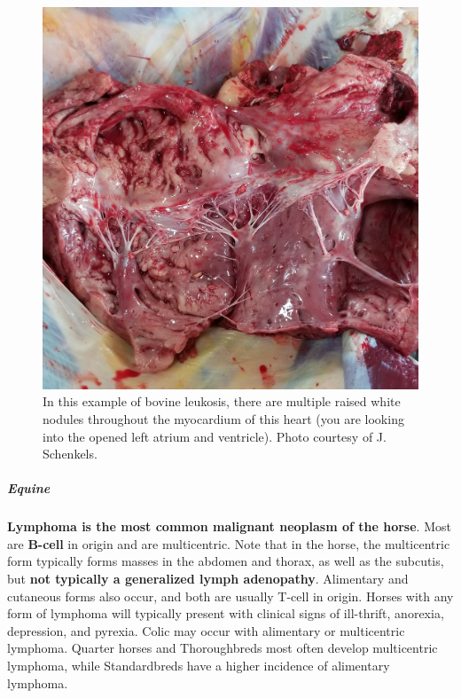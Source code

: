 \documentclass[openany]{article}
\let\oldsubparagraph\subparagraph
\renewcommand{\subparagraph}[1]{\oldsubparagraph{#1}\mbox{}}
\begin{document}
\begin{figure}

{\centering \includegraphics[width=1\linewidth]{images/bovine-leukosis-heart} 

}

\caption{In this example of bovine leukosis, there are multiple raised white nodules throughout the myocardium of this heart (you are looking into the opened left atrium and ventricle). Photo courtesy of J. Schenkels.}\label{fig:leukosis-heart}
\end{figure}

\subparagraph{Equine}\label{equine}

\textbf{Lymphoma is the most common malignant neoplasm of the horse}.
Most are \textbf{B-cell} in origin and are multicentric. Note that in
the horse, the multicentric form typically forms masses in the abdomen
and thorax, as well as the subcutis, but \textbf{not typically a
generalized lymph adenopathy}. Alimentary and cutaneous forms also
occur, and both are usually T-cell in origin. Horses with any form of
lymphoma will typically present with clinical signs of ill-thrift,
anorexia, depression, and pyrexia. Colic may occur with alimentary or
multicentric lymphoma. Quarter horses and Thoroughbreds most often
develop multicentric lymphoma, while Standardbreds have a higher
incidence of alimentary lymphoma.
\end{document}
